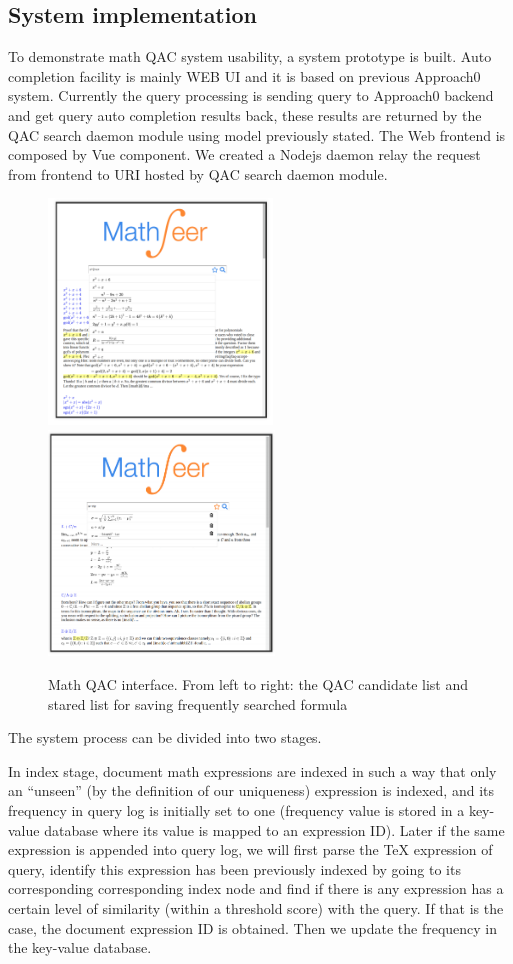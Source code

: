 \documentclass[12pt]{article} %
\begin{document}
\subsection{System implementation}
To demonstrate math QAC system usability, a system prototype is built.
Auto completion facility is mainly WEB UI and it is based on previous Approach0 system.
Currently the query processing is sending query to Approach0 backend and get
query auto completion results back, these results are returned by the QAC search daemon module
using model previously stated.
The Web frontend is composed by Vue component.
We created a Nodejs daemon relay the request from frontend to URI hosted by QAC search daemon module. 
\begin{figure}
\begin{center}
\includegraphics[height=6cm]{qac-system-suggest}
\includegraphics[height=6cm]{qac-system-star}
\caption{Math QAC interface. From left to right: the QAC candidate list and stared list for saving frequently searched formula}
\end{center}
\end{figure}

The system process can be divided into two stages.

In index stage, document math expressions are
indexed in such a way that only an ``unseen'' (by the definition of our uniqueness) expression is
indexed, and its frequency in query log is initially set to one (frequency value is stored in a key-value database where its value is mapped to an expression ID).
Later
if the same expression is appended into query log, we will first parse the TeX expression of query, identify this expression has been previously indexed by going to its corresponding corresponding index node and find if there is any expression has a certain level of similarity (within a threshold score) with the query. If that is the case, the document expression ID is obtained.
Then we update the frequency in the key-value database.
\end{document}
